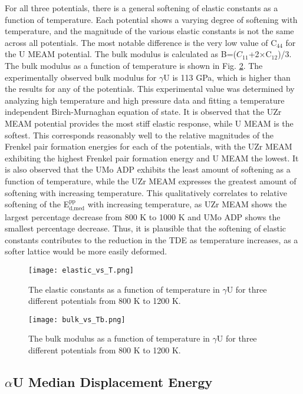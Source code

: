 \documentclass[review]{elsarticle}
\begin{document}
For all three potentials, there is a general softening of elastic constants as a function of temperature. Each potential shows a varying degree of softening with temperature, and the magnitude of the various elastic constants is not the same across all potentials. The most notable difference is the very low value of C$_{44}$ for the U MEAM potential. The bulk modulus is calculated as B=($C_{11}$+2$\times$C$_{12}$)/3. The bulk modulus as a function of temperature is shown in Fig. \ref{fig:bulk}. The experimentally observed bulk modulus for $\gamma$U is 113 GPa\cite{yoo1998}, which is higher than the results for any of the potentials. This experimental value was determined by analyzing high temperature and high pressure data and fitting a temperature independent Birch-Murnaghan equation of state. It is observed that the UZr MEAM potential provides the most stiff elastic response, while U MEAM is the softest. This corresponds reasonably well to the relative magnitudes of the Frenkel pair formation energies for each of the potentials, with the UZr MEAM exhibiting the highest Frenkel pair formation energy and U MEAM the lowest. It is also observed that the UMo ADP exhibits the least amount of softening as a function of temperature, while the UZr MEAM expresses the greatest amount of softening with increasing temperature. This qualitatively correlates to relative softening of the E$^{\textrm{pp}}_{\textrm{d,med}}$ with increasing temperature, as UZr MEAM shows the largest percentage decrease from 800 K to 1000 K and UMo ADP shows the smallest percentage decrease. Thus, it is plausible that the softening of elastic constants contributes to the reduction in the TDE as temperature increases, as a softer lattice would be more easily deformed. 


\begin{figure}[h]
 \centering
 \texttt{[image: elastic\_vs\_T.png]} 
 \caption{The elastic constants as a function of temperature in $\gamma$U for three different potentials from 800 K to 1200 K.}
 \label{fig:elastic}
\end{figure}

\begin{figure}[h]
 \centering
 \texttt{[image: bulk\_vs\_Tb.png]} 
 \caption{The bulk modulus as a function of temperature in $\gamma$U for three different potentials from 800 K to 1200 K.}
 \label{fig:bulk}
\end{figure}

\FloatBarrier

\subsection{$\alpha$U Median Displacement Energy}
\end{document}
